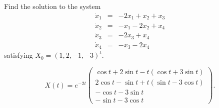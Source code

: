 \documentclass{ximera}
\begin{document}
\begin{exercise} \label{c11.1.2}
Find the solution to the system
\begin{eqnarray*}
\dot{x}_1 & = & -2x_1+x_2+x_3 \\
\dot{x}_2 & = & -x_1-2x_2+x_4 \\
\dot{x}_3 & = & -2x_3+x_4 \\
\dot{x}_4 & = & -x_3-2x_4
\end{eqnarray*}
satisfying $X_0=(1,2,-1,-3)^t$.

\begin{solution}
\ans
\[
X(t) = e^{-2t}
\left(\begin{array}{c}
\cos t + 2\sin t - t(\cos t + 3\sin t) \\
2\cos t - \sin t + t(\sin t - 3\cos t) \\
-\cos t - 3\sin t \\
-\sin t - 3\cos t
\end{array}\right).
\]


\end{solution}
\end{exercise}
\end{document}
